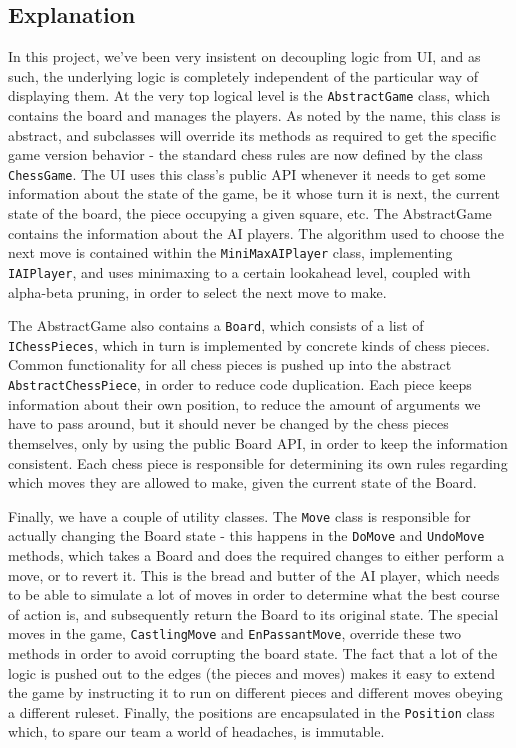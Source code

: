 \documentclass{article}
\begin{document}
\subsection*{Explanation}

In this project, we've been very insistent on decoupling logic from UI, and as such, the underlying logic is completely independent of the particular way of displaying them. At the very top logical level is the \texttt{AbstractGame} class, which contains the board and manages the players. As noted by the name, this class is abstract, and subclasses will override its methods as required to get the specific game version behavior - the standard chess rules are now defined by the class \texttt{ChessGame}. The UI uses this class's public API whenever it needs to get some information about the state of the game, be it whose turn it is next, the current state of the board, the piece occupying a given square, etc. The AbstractGame contains the information about the AI players. The algorithm used to choose the next move is contained within the \texttt{MiniMaxAIPlayer} class, implementing \texttt{IAIPlayer}, and uses minimaxing to a certain lookahead level, coupled with alpha-beta pruning, in order to select the next move to make.

The AbstractGame also contains a \texttt{Board}, which consists of a list of \texttt{IChessPieces}, which in turn is implemented by concrete kinds of chess pieces. Common functionality for all chess pieces is pushed up into the abstract \texttt{AbstractChessPiece}, in order to reduce code duplication. Each piece keeps information about their own position, to reduce the amount of arguments we have to pass around, but it should never be changed by the chess pieces themselves, only by using the public Board API, in order to keep the information consistent. Each chess piece is responsible for determining its own rules regarding which moves they are allowed to make, given the current state of the Board.

Finally, we have a couple of utility classes. The \texttt{Move} class is responsible for actually changing the Board state - this happens in the \texttt{DoMove} and \texttt{UndoMove} methods, which takes a Board and does the required changes to either perform a move, or to revert it. This is the bread and butter of the AI player, which needs to be able to simulate a lot of moves in order to determine what the best course of action is, and subsequently return the Board to its original state. The special moves in the game, \texttt{CastlingMove} and \texttt{EnPassantMove}, override these two methods in order to avoid corrupting the board state. The fact that a lot of the logic is pushed out to the edges (the pieces and moves) makes it easy to extend the game by instructing it to run on different pieces and different moves obeying a different ruleset. Finally, the positions are encapsulated in the \texttt{Position} class which, to spare our team a world of headaches, is immutable.\\
\end{document}
